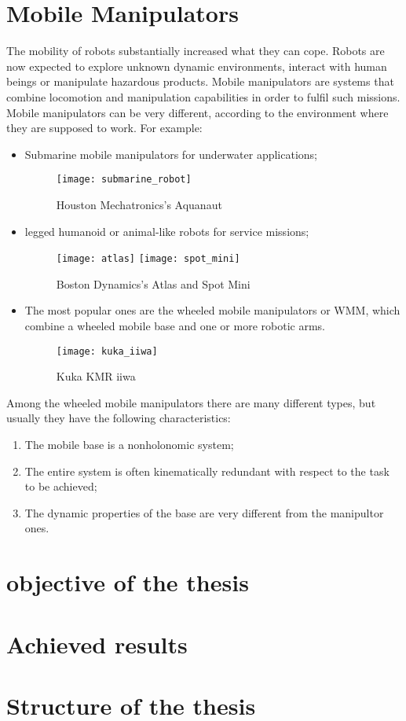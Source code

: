\section{Mobile Manipulators}
The mobility of robots substantially increased what they can cope. Robots are now expected to explore unknown dynamic environments, interact with human beings or manipulate hazardous products. Mobile manipulators are systems that combine locomotion and manipulation capabilities in order to fulfil such missions. \\



Mobile manipulators can be very different, according to the environment where they are supposed to work. For example:
\begin{itemize}
	\item Submarine mobile manipulators for underwater applications;
	\begin{figure}[h!]
		\centering
		\texttt{[image: submarine\_robot]}
		\caption{Houston Mechatronics's Aquanaut}
		\label{fig:aquanaut} 
	\end{figure}
	\item legged humanoid or animal-like robots for service missions;
	\begin{figure}[h!]
		\centering 
		\texttt{[image: atlas]}
		\label{fig:atlas} 
		\quad
		\texttt{[image: spot\_mini]}
		\label{fig:spotmini} 
		\caption{Boston Dynamics's Atlas and Spot Mini}
	\end{figure}
	\item The most popular ones are the wheeled mobile manipulators or WMM, which combine a wheeled mobile base and one or more robotic arms.
	\begin{figure}[h!]
		\centering
		\texttt{[image: kuka\_iiwa]}
		\caption{Kuka KMR iiwa}
		\label{fig:iiwa} 
	\end{figure}
\end{itemize}
Among the wheeled mobile manipulators there are many different types, but usually they have the following characteristics:
\begin{enumerate}
	\item The mobile base is a nonholonomic system;
	\item The entire system is often kinematically redundant with respect to the task to be achieved;
	\item The dynamic properties of the base are very different from the manipultor ones.
\end{enumerate}


\section{objective of the thesis}
\section{Achieved results}
\section{Structure of the thesis}


